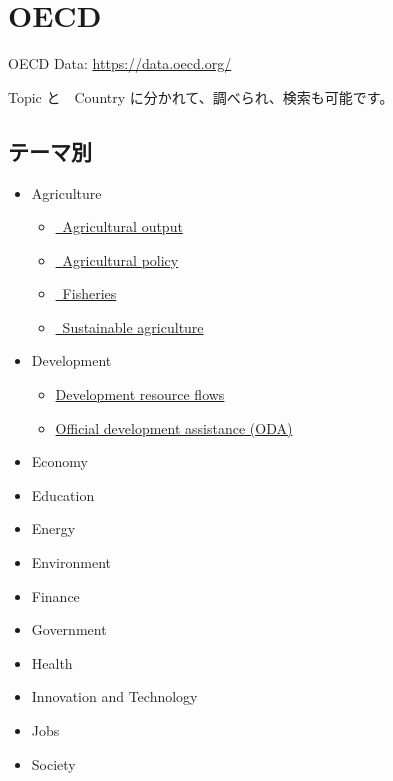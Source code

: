 \documentclass[
  xelatex, ja=standard]{bxjsbook}
\theoremstyle{definition}
\theoremstyle{definition}
\theoremstyle{definition}
\theoremstyle{definition}
\theoremstyle{remark}
\begin{document}
\hypertarget{oecd}{%
\section{OECD}\label{oecd}}

OECD Data: \url{https://data.oecd.org/}

Topic と　Country に分かれて、調べられ、検索も可能です。

\hypertarget{ux30c6ux30fcux30deux5225}{%
\subsection{テーマ別}\label{ux30c6ux30fcux30deux5225}}

\begin{itemize}
\item
  Agriculture

  \begin{itemize}
  \item
    \href{https://data.oecd.org/agriculture.htm\#profile-Agricultural\%20output}{~Agricultural output}
  \item
    \href{https://data.oecd.org/agriculture.htm\#profile-Agricultural\%20policy}{~Agricultural policy}
  \item
    \href{https://data.oecd.org/agriculture.htm\#profile-Fisheries}{~Fisheries}
  \item
    \href{https://data.oecd.org/agriculture.htm\#profile-Sustainable\%20agriculture}{~Sustainable agriculture}
  \end{itemize}
\item
  Development

  \begin{itemize}
  \item
    \href{https://data.oecd.org/drf/total-official-and-private-flows.htm}{Development resource flows}
  \item
    \href{https://data.oecd.org/oda/net-oda.htm}{Official development assistance (ODA)}
  \end{itemize}
\item
  Economy
\item
  Education
\item
  Energy
\item
  Environment
\item
  Finance
\item
  Government
\item
  Health
\item
  Innovation and Technology
\item
  Jobs
\item
  Society
\end{itemize}
\end{document}
